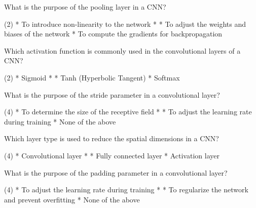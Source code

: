\documentclass[10pt]{extarticle}
\begin{document}
\begin{exercise}
    What is the purpose of the pooling layer in a CNN?
    \begin{choice} (2)
        * To introduce non-linearity to the network
        * 
        * To adjust the weights and biases of the network
        * To compute the gradients for backpropagation
    \end{choice}
\end{exercise}
\begin{solution}
\end{solution}

\begin{exercise}
    Which activation function is commonly used in the convolutional layers of a CNN?
    \begin{choice} (2)
        * Sigmoid
        * 
        * Tanh (Hyperbolic Tangent)
        * Softmax
    \end{choice}
\end{exercise}
\begin{solution}
\end{solution}

\begin{exercise}
    What is the purpose of the stride parameter in a convolutional layer?
    \begin{choice} (4)
        * To determine the size of the receptive field
        * 
        * To adjust the learning rate during training
        * None of the above
    \end{choice}
\end{exercise}
\begin{solution}
\end{solution}

\begin{exercise}
    Which layer type is used to reduce the spatial dimensions in a CNN?
    \begin{choice} (4)
        * Convolutional layer
        * 
        * Fully connected layer
        * Activation layer
    \end{choice}
\end{exercise}
\begin{solution}
\end{solution}

\begin{exercise}
    What is the purpose of the padding parameter in a convolutional layer?
    \begin{choice} (4)
        * To adjust the learning rate during training
        * 
        * To regularize the network and prevent overfitting
        * None of the above
    \end{choice}
\end{exercise}
\begin{solution}
\end{solution}
\end{document}
